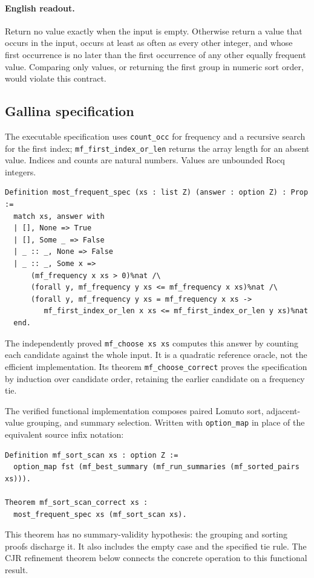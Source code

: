 \paragraph{English readout.}
Return no value exactly when the input is empty. Otherwise return a value
that occurs in the input, occurs at least as often as every other integer,
and whose first occurrence is no later than the first occurrence of any
other equally frequent value. Comparing only values, or returning the
first group in numeric sort order, would violate this contract.

\subsection{Gallina specification}

The executable specification uses \texttt{count\_occ} for frequency and a
recursive search for the first index; \texttt{mf\_first\_index\_or\_len}
returns the array length for an absent value. Indices and counts are
natural numbers. Values are unbounded Rocq integers.
\begin{lstlisting}
Definition most_frequent_spec (xs : list Z) (answer : option Z) : Prop :=
  match xs, answer with
  | [], None => True
  | [], Some _ => False
  | _ :: _, None => False
  | _ :: _, Some x =>
      (mf_frequency x xs > 0)%nat /\
      (forall y, mf_frequency y xs <= mf_frequency x xs)%nat /\
      (forall y, mf_frequency y xs = mf_frequency x xs ->
         mf_first_index_or_len x xs <= mf_first_index_or_len y xs)%nat
  end.
\end{lstlisting}
The independently proved \texttt{mf\_choose xs xs} computes this answer by
counting each candidate against the whole input. It is a quadratic
reference oracle, not the efficient implementation. Its theorem
\texttt{mf\_choose\_correct} proves the specification by induction over
candidate order, retaining the earlier candidate on a frequency tie.

The verified functional implementation composes paired Lomuto sort,
adjacent-value grouping, and summary selection. Written with
\texttt{option\_map} in place of the equivalent source infix notation:
\begin{lstlisting}
Definition mf_sort_scan xs : option Z :=
  option_map fst (mf_best_summary (mf_run_summaries (mf_sorted_pairs xs))).

Theorem mf_sort_scan_correct xs :
  most_frequent_spec xs (mf_sort_scan xs).
\end{lstlisting}
This theorem has no summary-validity hypothesis: the grouping and sorting
proofs discharge it. It also includes the empty case and the specified
tie rule. The CJR refinement theorem below connects the concrete operation to this functional result.

